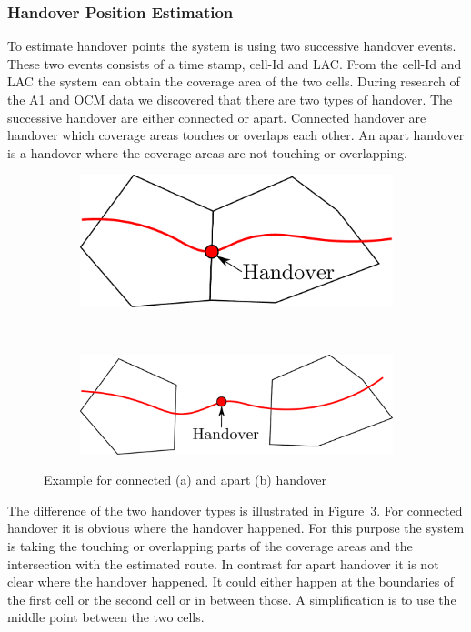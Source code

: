 \documentclass[master,english]{hgbthesis}
\begin{document}
\subsubsection{Handover Position Estimation}
To estimate handover points the system is using two successive handover events. These two events consists of a time stamp, cell-Id and LAC. From the cell-Id and LAC the system can obtain the coverage area of the two cells. During research of the A1 and OCM data we discovered that there are two types of handover. The successive handover are either connected or apart. Connected handover are handover which coverage areas touches or overlaps each other. An apart handover is a handover where the coverage areas are not touching or overlapping.
\begin{figure}
	\centering
	\begin{subfigure}[b]{0.4\textwidth}
		\includegraphics[width=\textwidth]{./images/handover_together}
		\caption{}
		\label{fig:handovertogether}
	\end{subfigure}%
	~ %
	\begin{subfigure}[b]{0.55\textwidth}
		\includegraphics[width=\textwidth]{./images/handover_apart}
		\caption{}
		\label{fig:handoverapart}
	\end{subfigure}
	\caption{Example for connected (a) and apart (b) handover}
	\label{fig:handovertypes}
\end{figure}
The difference of the two handover types is illustrated in Figure~\ref{fig:handovertypes}. For connected handover it is obvious where the handover happened. For this purpose the system is taking the touching or overlapping parts of the coverage areas and the intersection with the estimated route. In contrast for apart handover it is not clear where the handover happened. It could either happen at the boundaries of the first cell or the second cell or in between those. A simplification is to use the middle point between the two cells.
\end{document}
